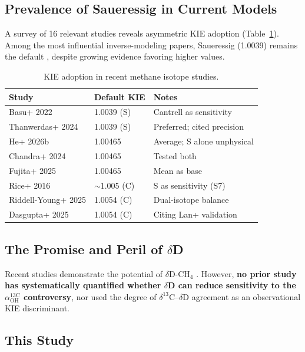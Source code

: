 \documentclass[11pt,twocolumn]{article}
\begin{document}
\subsection{Prevalence of Saueressig in Current Models}

A survey of 16 relevant studies reveals asymmetric KIE adoption (Table~\ref{tab:kie_survey}). Among the most influential inverse-modeling papers, Saueressig (1.0039) remains the default \citep{Basu2022,Thanwerdas2024}, despite growing evidence favoring higher values.

\begin{table}[h]
\caption{KIE adoption in recent methane isotope studies.}
\label{tab:kie_survey}
\centering
\footnotesize
\begin{tabular}{lll}
\toprule
Study & Default KIE & Notes \\
\midrule
Basu+ 2022 & 1.0039 (S) & Cantrell as sensitivity \\
Thanwerdas+ 2024 & 1.0039 (S) & Preferred; cited precision \\
He+ 2026b & 1.00465 & Average; S alone unphysical \\
Chandra+ 2024 & 1.00465 & Tested both \\
Fujita+ 2025 & 1.00465 & Mean as base \\
Rice+ 2016 & $\sim$1.005 (C) & S as sensitivity (S7) \\
Riddell-Young+ 2025 & 1.0054 (C) & Dual-isotope balance \\
Dasgupta+ 2025 & 1.0054 (C) & Citing Lan+ validation \\
\bottomrule
\end{tabular}
\end{table}

\subsection{The Promise and Peril of $\delta$D}

Recent studies demonstrate the potential of $\delta$D-CH$_4$ \citep{Rice2016,RiddellYoung2025}. However, \textbf{no prior study has systematically quantified whether $\delta$D can reduce sensitivity to the $\alpha_{\mathrm{OH}}^{13\mathrm{C}}$ controversy}, nor used the degree of $\delta^{13}$C--$\delta$D agreement as an observational KIE discriminant.

\subsection{This Study}
\end{document}
